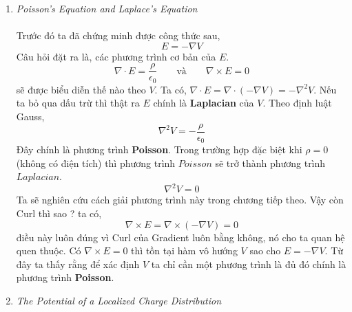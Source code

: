 \begin{enumerate}
\textbf{Solution.} Từ định luật Gauss, ta có điện trường bên ngoài mặt cầu sẽ là:
\[
E = \frac{q}{4\pi\epsilon_{0}r^2} \hat{r}
\]
Vì điện tích chỉ tồn tại trên mặt cầu nên điện trường bên trong mặt sẽ bằng không. Với những điểm nằm ngoài mặt cầu ta bao chúng lại bằng một mặt cầu lớn hơn có $(\mathbf{r} > R)$.
\[
V(\mathbf{r}) = - \int_{\infty}^{\mathbf{r}} E \cdot \, dI = - \int_{\infty}^{r} \frac{q}{4\pi\epsilon_{0}r^2}\hat{r} \cdot \, dr\hat{r}
\]
Vì $dI = 
dr \hat{r}+
rd\theta\hat{\theta}+
r\sin(\phi)\hat{\phi}$ \,\,\,
vậy,
\[
V(\mathbf{r}) = \frac{q}{4\pi\epsilon_{0}r} \Big|_{\infty}^{\mathbf{r}} = \frac{q}{4\pi\epsilon_{0}\mathbf{r}}
\]
Với những điểm nàm trong mặt cầu ta sẽ tính như sau $(\mathbf{r}<R)$,
\[
V(\mathbf{r}) = - \int_{\infty}^{\mathbf{r}} E \cdot \, dI = - \int_{\infty}^{R} E \cdot \, dI - \int_{R}^{\mathbf{r}} E \cdot \, dI
\]
rõ ràng trong mặt cầu thì $E = 0$ nên,
\[
V(\mathbf{r}) = - \int_{\infty}^{\mathbf{r}} E \cdot \, dI = - \int_{\infty}^{R} \frac{q}{4\pi\epsilon_{0}r^2}\hat{r} \cdot \, dr\hat{r} - \int_{R}^{\mathbf{r}} 0 \cdot \, dr\hat{r} = \frac{q}{4\pi\epsilon_{0}R}
\]
\textbf{Nhận xét.} kết quả trên là hợp lý vì $E = -\nabla V = 0$ nên rõ ràng $V$ phải là trường hằng với những điểm nằm trong mặt cầu.
\item \textit{Poisson's Equation and Laplace's Equation}\\ \\
Trước đó ta đã chứng minh được công thức sau,
\[
E = -\nabla V 
\]
Câu hỏi đặt ra là, các phương trình cơ bản của $E$.
\[
\nabla \cdot E = \frac{\rho}{\epsilon_{0}} \qquad \text{và} \qquad \nabla \times E = 0
\]
sẽ được biểu diễn thế nào theo $V$. Ta có, $\nabla \cdot E = \nabla \cdot (-\nabla V) = -\nabla^2 V$. Nếu ta bỏ qua dấu trừ thì thật ra $E$ chính là \textbf{Laplacian} của $V$. Theo định luật Gauss,
\[
\nabla^2 V = -\frac{\rho}{\epsilon_{0}}
\]
Đây chính là phương trình \textbf{Poisson}. Trong trường hợp đặc biệt khi $\rho = 0$\, (không có điện tích) thì phương trình $Poisson$ sẽ trở thành phương trình $Laplacian$.
\[
\nabla^{2} V = 0
\]
Ta sẽ nghiên cứu cách giải phương trình này trong chương tiếp theo. Vậy còn Curl thì sao ? ta có,
\[
\nabla \times E = \nabla \times (-\nabla V) = 0
\]
điều này luôn đúng vì Curl của Gradient luôn bằng không, nó cho ta quan hệ quen thuộc. Có $\nabla \times E = 0$ thì tồn tại hàm vô hướng $V$ sao cho $E = -\nabla V$. Từ đây ta thấy rằng để xác định $V$ ta chỉ cần một phương trình là đủ đó chính là phương trình \textbf{Poisson}.
\item \textit{The Potential of a Localized Charge Distribution}\\ \\

\end{enumerate}
